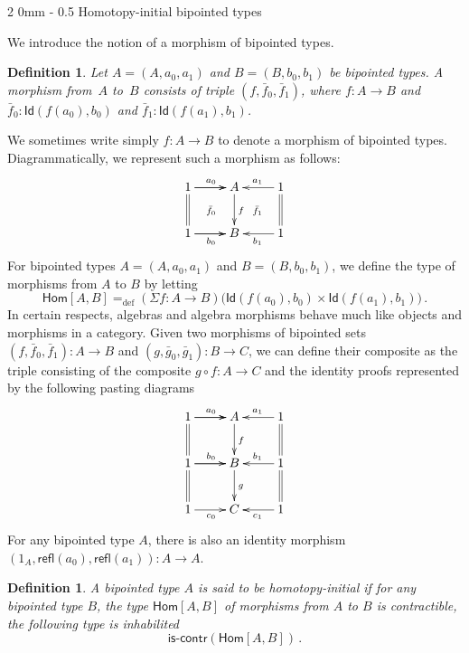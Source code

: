 \documentclass[reqno,10pt,a4paper,oneside]{amsart}
\makeatletter
\newcommand{\co}{\colon}
\newcommand{\defeq}{=_{\mathrm{def}}}
\newcommand{\Id}{\mathsf{Id}}
\newcommand{\refl}{\mathsf{refl}}
\newcommand{\Hom}{\mathsf{Hom}}
\newcommand{\iscontr}{\mathsf{is}\text{-}\mathsf{contr}}
\renewcommand{\subsection}{\@startsection
  {subsection}%
  {2}%
  {0mm}%
  {-\baselineskip}%
  {0.5\baselineskip}%
  {\normalfont\normalsize\bf}}%
\newcommand{\ie}{\text{i.e.\ }}
\numberwithin{equation}{section}
\theoremstyle{mythm}
\theoremstyle{mydef}
\newtheorem{definition}[theorem]{Definition}
\theoremstyle{myrmk}
\makeatother
\begin{document}
\subsection{Homotopy-initial bipointed types}



We introduce the notion of a morphism of bipointed types.

\begin{definition} Let $A = (A, a_0, a_1)$ and $B = (B, b_0, b_1)$ be bipointed types. A \emph{morphism} from~$A$ to~$B$ consists of
triple $(f, \bar{f}_0, \bar{f}_1)$, where  $f \co A \to B$ and $\bar{f}_0 \co \Id( f(a_0), b_0)$ and $\bar{f}_1 \co \Id(f(a_1), b_1)$.
\end{definition}

We sometimes write simply $f \co A \to B$ to denote a morphism of bipointed types. Diagrammatically, we represent such a morphism
as follows:
\[
\xymatrix{
1 \ar[r]  \ar@{=}[d]  \ar[r]^{a_0}  \ar@{}[dr]|{\bar{f}_0} & A  \ar[d]^{f} & 1 \ar@{=}[d] \ar[l]_{a_1} \ar@{}[dl]|{\bar{f}_1} \\
1 \ar[r] \ar[r]_{b_0}   & B  & 1\ar[l]^{b_1} }
 \]
For bipointed types $A = (A, a_0, a_1)$ and $B = (B, b_0, b_1)$, we define the type of morphisms from $A$ to $B$ by letting
\[
\Hom[A,B] \defeq (\Sigma f \co A \to B) \big( \Id( f(a_0), b_0) \times \Id( f(a_1), b_1) \big) \, .
\]
In certain respects, algebras and algebra morphisms behave much like objects and morphisms in a category.
Given two morphisms of bipointed sets $(f, \bar{f}_0, \bar{f}_1) \co A \to B$ and $(g, \bar{g}_0, \bar{g}_1) \co B \to C$, we can define their composite 
 as the triple consisting of the composite $g \circ f \co A \to C$ and the identity proofs represented
by the following pasting diagrams
\[
\xymatrix{
1 \ar[r]  \ar@{=}[d]  \ar[r]^{a_0} & A  \ar[d]^{f} & 1 \ar@{=}[d] \ar[l]_{a_1} \\
1 \ar[r] \ar[r]^{b_0} \ar@{=}[d]  & B \ar[d]^g & 1 \ar@{=}[d] \ar[l]_{b_1} \\
1 \ar[r]_{c_0}  & C & 1 \ar[l]^{c_1} }
\]
For any bipointed type $A$, there is also an identity morphism $(1_A, \refl(a_0), \refl(a_1)) \co A \to A$. 



\begin{definition}\label{def:BoolInit}
A bipointed type $A$ is said to be \emph{homotopy-initial}  if for any bipointed type $B$, the type $\Hom[A,B]$ of morphisms from $A$ to $B$
is contractible, \ie the following type is inhabilited
\[
 \iscontr(\Hom[ A, B] ) \, .
\]  
\end{definition}
\end{document}
